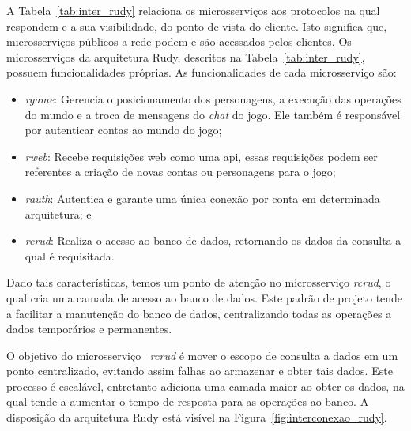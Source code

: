 A Tabela~\ref{tab:inter_rudy} relaciona os microsserviços aos protocolos na qual respondem e a sua visibilidade, do ponto de vista do cliente.
%
Isto significa que, microsserviços públicos a rede podem e são acessados pelos clientes.
%
Os microsserviços da arquitetura Rudy, descritos na Tabela~\ref{tab:inter_rudy}, possuem funcionalidades próprias.
%
As funcionalidades de cada microsserviço são:



\begin{itemize}
  \item \textit{rgame}: Gerencia o posicionamento dos personagens, a execução das operações do mundo e a troca de mensagens do \textit{chat} do jogo. Ele também é responsável por autenticar contas ao mundo do jogo;
  \item \textit{rweb}: Recebe requisições web como uma \ac{api}, essas requisições podem ser referentes a criação de novas contas ou personagens para o jogo;
  \item \textit{rauth}: Autentica e garante uma única conexão por conta em determinada arquitetura; e
  \item \textit{rcrud}: Realiza o acesso ao banco de dados, retornando os dados da consulta a qual é requisitada.
\end{itemize}



Dado tais características, temos um ponto de atenção no microsserviço \textit{rcrud}, o qual cria uma camada de acesso ao banco de dados.
%
Este padrão de projeto tende a facilitar a manutenção do banco de dados, centralizando todas as operações a dados temporários e permanentes.

O objetivo do microsserviço ~\textit{rcrud} é mover o escopo de consulta a dados em um ponto centralizado, evitando assim falhas ao armazenar e obter tais dados.
%
Este processo é escalável, entretanto adiciona uma camada maior ao obter os dados, na qual tende a aumentar o tempo de resposta para as operações ao banco.
%
A disposição da arquitetura Rudy está visível na Figura~\ref{fig:interconexao_rudy}.




